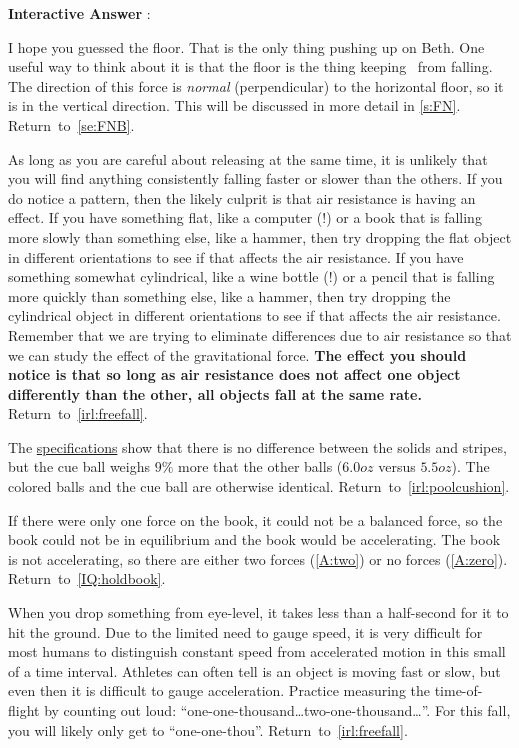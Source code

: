 \documentclass[11pt,letter,openany,makeidx]{book}
\newcommand{\return}[1]{{} \hfill \mbox{Return to \ref{#1}.}}
\newcommand{\autoreturn}[1]{{} \hfill \mbox{Return to \autoref{#1}.}}
\newcounter{AtIQ}
\renewcommand{\theAtIQ}{Answer \arabic{AtIQ}}
\newenvironment{AIQ}{\begin{list}{\textbf{Interactive \theAtIQ}:}{\usecounter{AtIQ} \leftmargin 12pt}}{\end{list}}
\newcommand{\studentB}{Beth}        \newcommand{\massB}{\mbox{$75.0\unit{kg}$}}
\begin{document}
\begin{AIQ}
\item\label{A:floor}  I hope you guessed the floor.  That is the only thing pushing up on \studentB\index{\studentB}.  One useful way to think about it is that the floor is the thing keeping \himB\ from falling.  The direction of this force is \textit{normal} (perpendicular) to the horizontal floor, so it is in the vertical direction.  This will be discussed in more detail in \autoref{s:FN}. \return{se:FNB}
\item\label{A:firstwhy} As long as you are careful about releasing at the same time, it is unlikely that you will find anything consistently falling faster or slower than the others.  If you do notice a pattern, then the likely culprit is that air resistance is having an effect.  If you have something flat, like a computer (!) or a book that is falling more slowly than something else, like a hammer, then try dropping the flat object in different orientations to see if that affects the air resistance.  If you have something somewhat cylindrical, like a wine bottle (!) or a pencil that is falling more quickly than something else, like a hammer, then try dropping the cylindrical object in different orientations to see if that affects the air resistance. Remember that we are trying to eliminate differences due to air resistance so that we can study the effect of the gravitational force. \textbf{The effect you should notice is that so long as air resistance does not affect one object differently than the other, all objects fall at the same rate.}  \autoreturn{irl:freefall}
\item\label{A:noncue} The \href{http://wpapool.com/equipment-specifications/\#Balls-and-Ball-Rack}{specifications} show that there is no difference between the solids and stripes, but the cue ball weighs $9\%$ more that the other balls ($6.0\unit{oz}$ versus $5.5\unit{oz}$).  The colored balls and the cue ball are otherwise identical.  \autoreturn{irl:poolcushion}
\item\label{A:one} If there were only one force on the book, it could not be a balanced force, so the book could not be in equilibrium and the book would be accelerating.  The book is not accelerating, so there are either two forces (\ref{A:two}) or no forces (\ref{A:zero}).  \return{IQ:holdbook}
\item\label{A:fallv} When you drop something from eye-level, it takes less than a half-second for it to hit the ground.  Due to the limited need to gauge speed, it is very difficult for most humans to distinguish constant speed from accelerated motion in this small of a time interval.  Athletes can often tell is an object is moving fast or slow, but even then it is difficult to gauge acceleration.  Practice measuring the time-of-flight by counting out loud: ``one-one-thousand\ldots two-one-thousand\ldots''.  For this fall, you will likely only get to ``one-one-thou''. \autoreturn{irl:freefall}

\end{AIQ}
\end{document}
